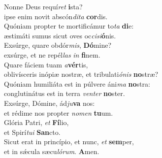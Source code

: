 \evenverse Nonne Deus requí\textit{ret} \textbf{i}sta?~\*\\
\evenverse ipse enim novit abscón\textit{di}\textit{ta} \textbf{cor}dis.\\
\oddverse Quóniam propter te mortificámur to\textit{ta} \textbf{di}e:~\*\\
\oddverse æstimáti sumus sicut oves oc\textit{ci}\textit{si}\textbf{ó}nis.\\
\evenverse Exsúrge, quare obdór\textit{mis}, \textbf{Dó}mine?~\*\\
\evenverse exsúrge, et ne repél\textit{las} \textit{in} \textbf{fi}nem.\\
\oddverse Quare fáciem tuam \textit{a}\textbf{vér}tis,~\*\\
\oddverse oblivísceris inópiæ nostræ, et tribulati\textit{ó}\textit{nis} \textbf{no}stræ?\\
\evenverse Quóniam humiliáta est in púlvere áni\textit{ma} \textbf{no}stra:~\*\\
\evenverse conglutinátus est in terra \textit{ven}\textit{ter} \textbf{no}ster.\\
\oddverse Exsúrge, Dómine, ád\textit{ju}\textbf{va} nos:~\*\\
\oddverse et rédime nos propter \textit{no}\textit{men} \textbf{tu}um.\\
\evenverse Glória Patri, \textit{et} \textbf{Fí}lio,~\*\\
\evenverse et Spirí\textit{tu}\textit{i} \textbf{San}cto.\\
\oddverse Sicut erat in princípio, et nunc, \textit{et} \textbf{sem}per,~\*\\
\oddverse et in sǽcula sæcu\textit{ló}\textit{rum}. \textbf{A}men.\\
